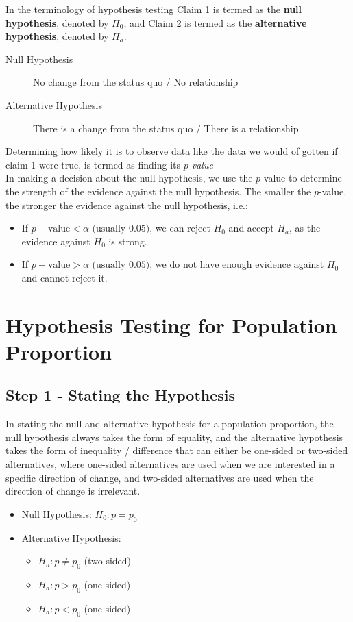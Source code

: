 \documentclass[12pt letter]{report}
\begin{document}
In the terminology of hypothesis testing Claim 1 is termed as the \textbf{null hypothesis}, denoted by $H_0$, and Claim
2 is termed as the \textbf{alternative hypothesis}, denoted by $H_a$.

\begin{description}
  \item[Null Hypothesis] No change from the status quo / No relationship
  \item[Alternative Hypothesis] There is a change from the status quo / There is a relationship
\end{description}

Determining how likely it is to observe data like the data we would of gotten if claim 1 were true, is termed as
finding its \textit{$p$-value} \\

In making a decision about the null hypothesis, we use the $p$-value to determine the strength of the evidence against
the null hypothesis. The smaller the $p$-value, the stronger the evidence against the null hypothesis, i.e.:
\begin{itemize}
  \item If $p-\text{value} < \alpha \text{ (usually $0.05$)}$, we can reject $H_0$ and accept $H_{a}$, as the evidence
        against $H_0$ is strong.
  \item If $p-\text{value} > \alpha \text{ (usually $0.05$)}$, we do not have enough evidence against $H_0$ and cannot reject it.
\end{itemize}

\section{Hypothesis Testing for Population Proportion}

\subsection{Step 1 - Stating the Hypothesis}

In stating the null and alternative hypothesis for a population proportion, the null hypothesis always takes the form of
equality, and the alternative hypothesis takes the form of inequality / difference that can either be one-sided or
two-sided alternatives, where one-sided alternatives are used when we are interested in a specific direction of change,
and two-sided alternatives are used when the direction of change is irrelevant.
\begin{itemize}
  \item Null Hypothesis: $H_0: p = p_0$
  \item Alternative Hypothesis:
        \begin{itemize}
          \item $H_a: p \neq p_0$ (two-sided)
          \item $H_a: p > p_0$ (one-sided)
          \item $H_a: p < p_0$ (one-sided)
        \end{itemize}
\end{itemize}
\end{document}
